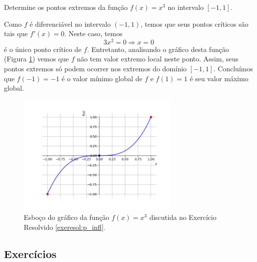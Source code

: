 \cleardoublepage\documentclass[../main.tex]{subfiles}
\begin{document}
\begin{exeresol}\label{exeresol:p_infl}
  Determine os pontos extremos da função $f(x)=x^3$ no intervalo $[-1, 1]$.
\end{exeresol}
\begin{resol}
  Como $f$ é diferenciável no intervalo $(-1, 1)$, temos que seus pontos críticos são tais que $f'(x)=0$. Neste caso, temos
  \begin{equation}
    3x^2=0\Rightarrow x=0
  \end{equation}
  é o único ponto crítico de $f$. Entretanto, analisando o gráfico desta função (Figura \ref{fig:exeresol_p_infl}) vemos que $f$ não tem valor extremo local neste ponto. Assim, seus pontos extremos só podem ocorrer nos extremos do domínio $[-1, 1]$. Concluímos que $f(-1)=-1$ é o valor mínimo global de $f$ e $f(1)=1$ é seu valor máximo global.

  \begin{figure}[H]
    \centering
    \includegraphics[width=0.7\textwidth]{./fig_apl_deriv/fig_exeresol_p_infl}
    \caption{Esboço do gráfico da função $f(x) = x^3$ discutida no Exercício Resolvido \ref{exeresol:p_infl}.}
    \label{fig:exeresol_p_infl}
  \end{figure}
\end{resol}

\subsection{Exercícios}
\end{document}

